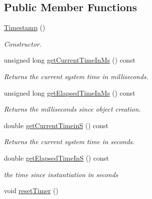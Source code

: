 \subsection*{Public Member Functions}
\begin{DoxyCompactItemize}
\item 
\hypertarget{classTimestamp_a2e610487ef16d9d5a8d6dc8ad457a3e7}{\hyperlink{classTimestamp_a2e610487ef16d9d5a8d6dc8ad457a3e7}{Timestamp} ()}\label{classTimestamp_a2e610487ef16d9d5a8d6dc8ad457a3e7}

\begin{DoxyCompactList}\small\item\em Constructor. \end{DoxyCompactList}\item 
\hypertarget{classTimestamp_a6a3a6be79b2630909a965723975f4c84}{unsigned long \hyperlink{classTimestamp_a6a3a6be79b2630909a965723975f4c84}{get\-Current\-Time\-In\-Ms} () const }\label{classTimestamp_a6a3a6be79b2630909a965723975f4c84}

\begin{DoxyCompactList}\small\item\em Returns the current system time in milliseconds. \end{DoxyCompactList}\item 
\hypertarget{classTimestamp_a641310172f62f61909ac5339c54e51a6}{unsigned long \hyperlink{classTimestamp_a641310172f62f61909ac5339c54e51a6}{get\-Elapsed\-Time\-In\-Ms} () const }\label{classTimestamp_a641310172f62f61909ac5339c54e51a6}

\begin{DoxyCompactList}\small\item\em Returns the milliseconds since object creation. \end{DoxyCompactList}\item 
\hypertarget{classTimestamp_a87f7c5b0947fbcf78658939252401787}{double \hyperlink{classTimestamp_a87f7c5b0947fbcf78658939252401787}{get\-Current\-Timein\-S} () const }\label{classTimestamp_a87f7c5b0947fbcf78658939252401787}

\begin{DoxyCompactList}\small\item\em Returns the current system time in seconds. \end{DoxyCompactList}\item 
double \hyperlink{classTimestamp_a6ab74f6c31b156bc4ba5a952d843c571}{get\-Elapsed\-Time\-In\-S} () const 
\begin{DoxyCompactList}\small\item\em the time since instantiation in seconds \end{DoxyCompactList}\item 
\hypertarget{classTimestamp_a0ff8334b18bd59a121b565560e9be9a3}{void \hyperlink{classTimestamp_a0ff8334b18bd59a121b565560e9be9a3}{reset\-Timer} ()}\label{classTimestamp_a0ff8334b18bd59a121b565560e9be9a3}


\end{DoxyCompactItemize}
